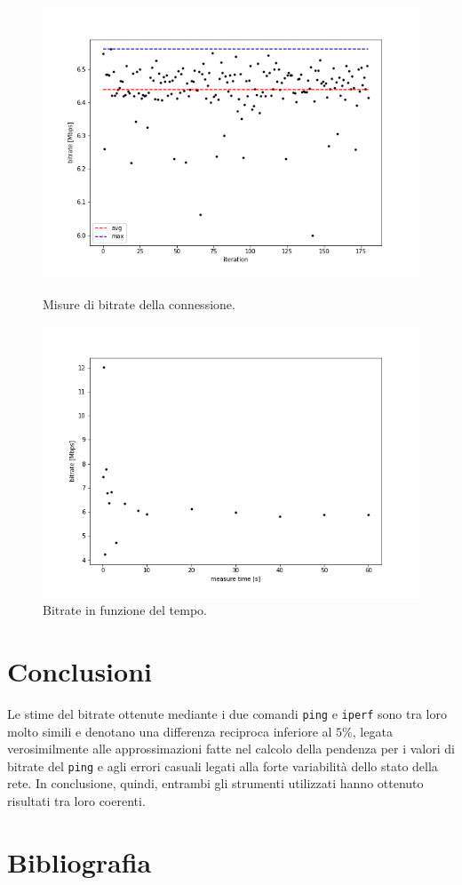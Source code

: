 \documentclass[a4paper,10pt]{article}
\begin{document}
\begin{figure}[!htb]
   \begin{minipage}{0.48\textwidth}
     \centering
         \includegraphics[width=1\linewidth]{img/iperf.png}
         \caption{Misure di bitrate della connessione.}
         \label{fig:iperf}
   \end{minipage}\hfill
   \begin{minipage}{0.48\textwidth}
      \centering
         \includegraphics[width=1\linewidth]{img/iperftime.png}
         \caption{Bitrate in funzione del tempo.}
         \label{fig:iperftime}
   \end{minipage}
\end{figure}

\section{Conclusioni}
Le stime del bitrate ottenute mediante i due comandi \texttt{ping} e \texttt{iperf} sono tra loro molto simili e denotano una differenza reciproca inferiore al $5\%$, legata verosimilmente alle approssimazioni fatte nel calcolo della pendenza per i valori di bitrate del \texttt{ping} e agli errori casuali legati alla forte variabilità dello stato della rete. In conclusione, quindi, entrambi gli strumenti utilizzati hanno ottenuto risultati tra loro coerenti.

\section{Bibliografia}
\printbibliography[heading=none]
\end{document}
